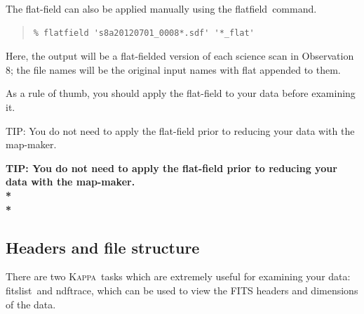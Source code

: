 \documentclass[twoside,11pt]{article}
\newenvironment{latexonly}{}{}
\newcommand{\xref}[3]{#1}
\newcommand{\xlabel}[1]{}
\renewcommand{\_}{\texttt{\symbol{95}}}
\newenvironment{fmpage}[1]{\begin{lrbox}{\fmbox}\begin{minipage}{#1}}{\end{minipage}\end{lrbox}\fbox{\usebox{\fmbox}}}
\newenvironment{myquote}{\begin{quote}\begin{small}}{\end{small}\end{quote}}
\newcommand{\Kappa}{\xref{\textsc{Kappa}}{sun95}{}}
\newcommand{\task}[1]{\textsf{#1}}
\newcommand{\flatfield}{\xref{\task{flatfield}}{sun258}{FLATFIELD}}
\newcommand{\fitslist}{\xref{\task{fitslist}}{sun95}{FITSLIST}}
\newcommand{\ndftrace}{\xref{\task{ndftrace}}{sun95}{NDFTRACE}}
\begin{document}
The flat-field can also be applied manually using the \flatfield\ command.

\begin{myquote}
\begin{verbatim}
% flatfield 's8a20120701_0008*.sdf' '*_flat'
\end{verbatim}
\end{myquote}
Here, the output will be a flat-fielded version of each science scan
in Observation 8; the file names will be the original input
names with \_flat appended to them.

As a rule of thumb, you should apply the flat-field to your data
before examining it.


\begin{latexonly}
\begin{center}
\begin{fmpage}{0.95\linewidth}
\vspace{0.1cm}
TIP: You do not need to apply the flat-field prior to reducing your
data with the map-maker.
\end{fmpage}
\end{center}
\end{latexonly}

\begin{htmlonly}
\textbf{TIP: You do not need to apply the flat-field
prior to reducing your data with the map-maker.\\*\\*}
\end{htmlonly}


\subsection{\xlabel{header}Headers and file structure}
\label{sec:fitsheader}

There are two \Kappa\ tasks which are extremely useful for examining
your data: \fitslist\ and \ndftrace, which can be used to view the
FITS headers and dimensions of the data.
\vspace{5mm}
\end{document}
